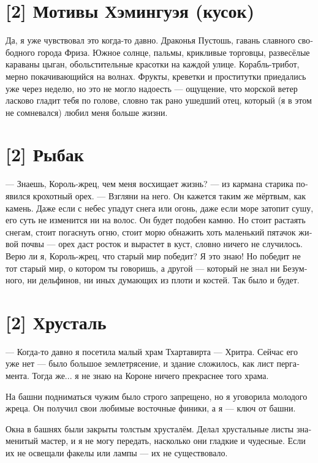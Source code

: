 \documentclass[a4paper,12pt,fleqn]{book}\usepackage{polyglossia}\setdefaultlanguage[babelshorthands=true]{russian}\setotherlanguage{english}\defaultfontfeatures{Ligatures=TeX,Mapping=tex-text}\usepackage{xcolor}\newcommand{\ml}[3]{#2}
\begin{document}
{\section{[2] Мотивы Хэмингуэя (кусок)}

Да, я уже чувствовал это когда-то давно.
Драконья Пустошь, гавань славного свободного города Фриза.
Южное солнце, пальмы, крикливые торговцы, развесёлые караваны цыган, обольстительные красотки на каждой улице.
Корабль-трибот, мерно покачивающийся на волнах.
Фрукты, креветки и проститутки приедались уже через неделю, но это не могло надоесть --- ощущение, что морской ветер ласково гладит тебя по голове, словно так рано ушедший отец, который (я в этом не сомневался) любил меня больше жизни.

\section{[2] Рыбак}

--- Знаешь, Король-жрец, чем меня восхищает жизнь? --- из кармана старика появился крохотный орех.
--- Взгляни на него.
Он кажется таким же мёртвым, как камень.
Даже если с небес упадут снега или огонь, даже если море затопит сушу, его суть не изменится ни на волос.
Он будет подобен камню.
Но стоит растаять снегам, стоит погаснуть огню, стоит морю обнажить хоть маленький пятачок живой почвы --- орех даст росток и вырастет в куст, словно ничего не случилось.
Верю ли я, Король-жрец, что старый мир победит?
Я это знаю!
Но победит не тот старый мир, о котором ты говоришь, а другой --- который не знал ни Безумного, ни дельфинов, ни иных думающих из плоти и костей.
Так было и будет.

\section{[2] Хрусталь}

--- Когда-то давно я посетила малый храм Тхартавирта --- Хритра.
Сейчас его уже нет --- было большое землетрясение, и здание сложилось, как лист пергамента.
Тогда же... я не знаю на Короне ничего прекраснее того храма.

На башни подниматься чужим было строго запрещено, но я уговорила молодого жреца.
Он получил свои любимые восточные финики, а я --- ключ от башни.

Окна в башнях были закрыты толстым хрусталём.
Делал хрустальные листы знаменитый мастер, и я не могу передать, насколько они гладкие и чудесные.
Если их не освещали факелы или лампы --- их не существовало.

}
\end{document}
